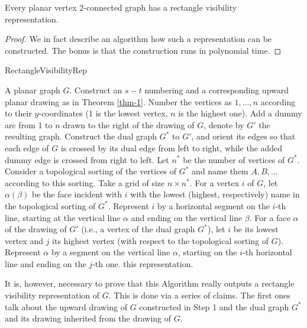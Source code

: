 \begin{thm}
	Every planar vertex 2-connected graph has a rectangle visibility \\ representation.
	\label{thm-2}
\end{thm}

\begin{proof}
	We in fact describe an algorithm how such a representation can be constructed. The bonus is that the construction runs in polynomial time.
\end{proof}

\begin{algorithm}[!ht]
	\caption{RectangleVisibilityRep}
	\begin{algorithmic}[1]
		\Require A planar graph $G$.
		\State Construct an $s - t$ numbering and a corresponding upward planar drawing as in Theorem \ref{thm-1}.
		\State Number the vertices as $1, \dots, n$ according to their $y$-coordinates (1 is the lowest vertex, $n$ is the highest one).
		\State Add a dummy arc from 1 to $n$ drawn to the right of the drawing of $G$, denote by $G'$ the resulting graph.
		\State Construct the dual graph $G^\ast$ to $G'$, and orient its edges so that each edge of $G$ is crossed by its dual edge from left to right, while the added dummy edge is crossed from right to left. Let $n^\ast$ be the number of vertices of $G^\ast$.
		\State Consider a topological sorting of the vertices of $G^\ast$ and name them $A, B, \dots$ according to this sorting.
		\State Take a grid of size $n \times n^\ast$. For a vertex $i$ of $G$, let $\alpha(\beta)$ be the face incident with $i$ with the lowest (highest, respectively) name in the topological sorting of $G^\ast$. Represent $i$ by a horizontal segment on the $i$-th line, starting at the vertical line $\alpha$ and ending on the vertical line $\beta$. For a face $\alpha$ of the drawing of $G'$ (i.e., a vertex of the dual graph $G^\ast$), let $i$ be its lowest vertex and $j$ its highest vertex (with respect to the topological sorting of $G$). Represent $\alpha$ by a segment on the vertical line $\alpha$, starting on the $i$-th horizontal line and ending on the $j$-th one.
		\State \Return this representation.
	\end{algorithmic}
\end{algorithm}

It is, however, necessary to prove that this Algorithm really outputs a rectangle visibility representation of $G$. This is done via a series of claims. The first ones talk about the upward drawing of $G$ constructed in Step 1 and the dual graph $G^\ast$ and its drawing inherited from the drawing of $G$.


